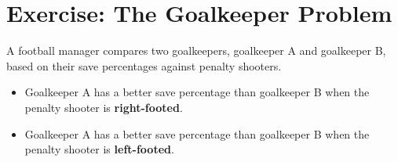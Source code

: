 \documentclass[11pt]{article}
\newif\ifshowanswers
\begin{document}
\ifshowanswers
\paragraph{Solution.}

We enumerate all the red sides that could be showing up:

\begin{itemize}
  \item The RR card has two red sides, so it can appear as either side: RR1 or RR2.
  \item The RB card has one red side: RB-red.
\end{itemize}

So the possible ways a red side can face up are: RR1, RR2, RB-red.
In two of them (RR1 and RR2), the hidden side is also red.
In one of them (RB-red), the hidden side is black.
So, the probability that the other side is red given a red side is up is:

\begin{align*}
  P(\text{other side is red} \mid \text{red side is up}) &= \frac{\text{Number of favorable outcomes}}{\text{Total outcomes}} \\
                                                         &= \frac{2}{3}
\end{align*}

\noindent
\textbf{Answer:} $\boxed{2/3}$

\noindent
\textbf{Intuitive Guess:} Many people guess $1/2$, reasoning that since there are two cards, and both are possible to be picked since both have a red side, the chances are even.
However, although both cards have a red side, the RR is more likely to be picked when a red side is seen because it has two red sides.
Specifically, it has a $\frac{2}{3}$ chance to be picked, while the RB card has only a $\frac{1}{3}$ chance to be picked.
\fi


\section{Exercise: The Goalkeeper Problem}

A football manager compares two goalkeepers, goalkeeper A and goalkeeper B, based on their save percentages against penalty shooters.

\begin{itemize}
  \item Goalkeeper A has a better save percentage than goalkeeper B when the penalty shooter is \textbf{right-footed}.
  \item Goalkeeper A has a better save percentage than goalkeeper B when the penalty shooter is \textbf{left-footed}.
\end{itemize}
\end{document}
